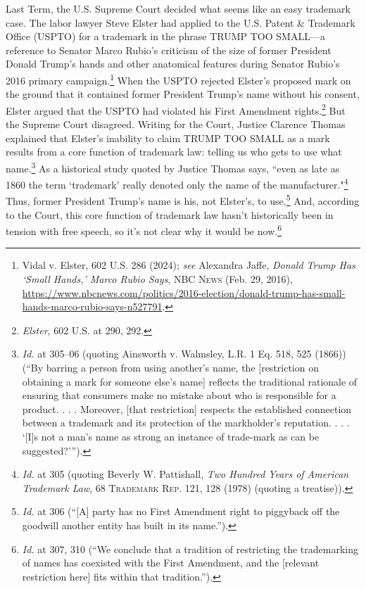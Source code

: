 \documentclass[letterpaper, 11pt, oneside]{article}
\begin{document}
Last Term, the U.S. Supreme Court decided what seems like an easy trademark case. The labor lawyer Steve Elster had applied to the U.S. Patent \& Trademark Office (USPTO) for a trademark in the phrase TRUMP TOO SMALL—a reference to Senator Marco Rubio's criticism of the size of former President Donald Trump's hands and other anatomical features during Senator Rubio's 2016 primary campaign.\footnote{Vidal v. Elster, 602 U.S. 286 (2024); \textit{see} Alexandra Jaffe, \textit{Donald Trump Has `Small Hands,' Marco Rubio Says}, \textsc{NBC News} (Feb. 29, 2016), \url{https://www.nbcnews.com/politics/2016-election/donald-trump-has-small-hands-marco-rubio-says-n527791}.} When the USPTO rejected Elster's proposed mark on the ground that it contained former President Trump's name without his consent, Elster argued that the USPTO had violated his First Amendment rights.\footnote{\textit{Elster}, 602 U.S. at 290, 292.} But the Supreme Court disagreed. Writing for the Court, Justice Clarence Thomas explained that Elster's inability to claim TRUMP TOO SMALL as a mark results from a core function of trademark law: telling us who gets to use what name.\footnote{\label{supra1} \textit{Id.} at 305–06 (quoting Ainsworth v. Walmsley, L.R. 1 Eq. 518, 525 (1866)) (``By barring a person from using another’s name, the [restriction on obtaining a mark for someone else's name] reflects the traditional rationale of ensuring that consumers make no mistake about who is responsible for a product. . . . Moreover, [that restriction] respects the established connection between a trademark and its protection of the markholder’s reputation. . . . `[I]s not a man’s name as strong an instance of trade-mark as can be suggested?'\thinspace'').} As a historical study quoted by Justice Thomas says, ``even as late as 1860 the term `trademark' really denoted only the name of the manufacturer."\footnote{\textit{Id.} at 305 (quoting Beverly W. Pattishall, \textit{Two Hundred Years of American Trademark Law}, 68 \textsc{Trademark Rep.} 121, 128 (1978) (quoting a treatise)).} Thus, former President Trump's name is his, not Elster's, to use.\footnote{\textit{Id.} at 306 (``[A] party has no First Amendment right to piggyback off the goodwill another entity has built in its name.'').} And, according to the Court, this core function of trademark law hasn't historically been in tension with free speech, so it's not clear why it would be now.\footnote{\textit{Id.} at 307, 310 (``We conclude that a tradition of restricting the trademarking of names has coexisted with the First Amendment, and the [relevant restriction here] fits within that tradition.'').}
\end{document}

